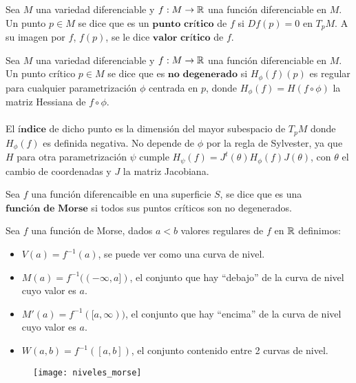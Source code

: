 \begin{definicion} Sea $M$ una variedad diferenciable y $f: M \rightarrow \mathbb{R}$ una función diferenciable en $M$. Un punto $p \in M$ se dice que es un $\textbf{punto crítico}$ de $f$ si $Df(p) = 0$ en $T_pM$. A su imagen por $f$, $f(p)$, se le dice $\textbf{valor crítico}$ de $f$.
\end{definicion}

\begin{definicion} Sea $M$ una variedad diferenciable y $f: M \rightarrow \mathbb{R}$ una función diferenciable en $M$. Un punto crítico $p \in M$ se dice que es $\textbf{no degenerado}$ si $H_\phi(f)(p)$ es regular para cualquier parametrización $\phi$ centrada en $p$, donde $H_\phi(f)=H(f \circ \phi)$ la matriz Hessiana de $f \circ \phi$.\\ 
\\ El $\textbf{índice}$ de dicho punto es la dimensión del mayor subespacio de $T_pM$ donde $H_\phi(f)$ es definida negativa. No depende de $\phi$ por la regla de Sylvester, ya que $H$ para otra parametrización $\psi$ cumple $H_\psi(f) = J^t(\theta) H_\phi(f) J(\theta)$, con $\theta$ el cambio de coordenadas y $J$ la matriz Jacobiana.
\end{definicion}

\begin{definicion} Sea $f$ una función diferencaible en una superficie $S$, se dice que es una $\textbf{función de Morse}$ si todos sus puntos críticos son no degenerados.
\end{definicion}

\newpage
\begin{definicion} Sea $f$ una función de Morse, dados $a < b$ valores regulares de $f$ en $\mathbb{R}$ definimos:
	\begin{itemize}
		\item $V(a) = f^{-1}(a)$, se puede ver como una curva de nivel.
		\item $M(a) = f^{-1}((-\infty, a])$, el conjunto que hay ``debajo'' de la curva de nivel cuyo valor es $a$.
		\item $M'(a) = f^{-1}([a,\infty))$, el conjunto que hay ``encima'' de la curva de nivel cuyo valor es $a$.
		\item $W(a,b) = f^{-1}([a,b])$, el conjunto contenido entre 2 curvas de nivel.
	\end{itemize}
\end{definicion}

\begin{figure}[h]
  	\centering
  	\texttt{[image: niveles\_morse]}
  	\label{fig:niveles_morse}
\end{figure}

\endinput
